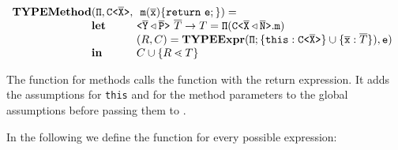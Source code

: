 \documentclass[a4paper,USenglish,cleveref, autoref, thm-restate, anonymous]{lipics-v2021}
\begin{document}
\begin{gather*}
\begin{array}{@{}l@{}l@{}l}
  \typeMethod & (\ensuremath{\mv{\Pi} }, \exptype{C}{\ol{X}},\ &\  \mathtt{m}(\ol{x})\{ \mathtt{ return }\ \texttt{e}; \}) =\\
              & \textbf{let} & \exptype{}{\ol{Y} \triangleleft \ol{P}}\ \overline{T} \to T  = \mv{\Pi} (\exptype{C}{\ol{X} \triangleleft \ol{N}}.\mv{m})
  \\
              & %
                                                                                              & ({R}, \consSet) =
                                                                                                \typeExpr(\mv\Pi ; \set{\mv{this} :
                                                                                                \exptype{C}{\ol{X}} } \cup \set{ \ol{x} : \overline{{T}} }), \texttt{e})\\
              & \mathbf{in}
                                                                                              & \consSet \cup \set{{R} \lessdot {T}}\\
\end{array}
\end{gather*}

The \typeMethod{} function for methods calls the \typeExpr{} function with the
return expression. It adds the assumptions for \texttt{this} and for the method parameters to the global assumptions before passing them to \typeExpr.

\smallskip

In the following we define the \typeExpr{} function for every possible expression:

\smallskip
\end{document}
